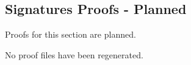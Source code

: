\subsection*{Signatures Proofs - Planned}

\begin{remark*}
Proofs for this section are planned.
\end{remark*}

\begin{remark*}
No proof files have been regenerated.
\end{remark*}
